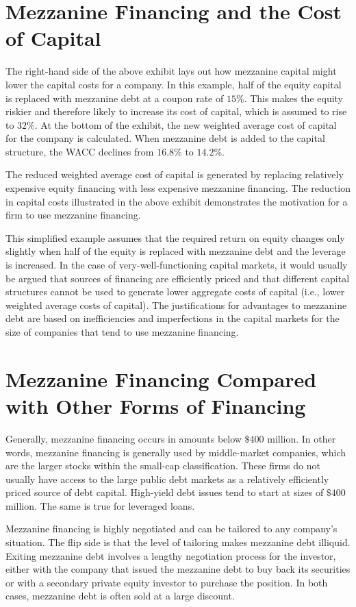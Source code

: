 \documentclass[11pt]{article}
\begin{document}
\section*{Mezzanine Financing and the Cost of Capital}
The right-hand side of the above exhibit lays out how mezzanine capital might lower the capital costs for a company. In this example, half of the equity capital is replaced with mezzanine debt at a coupon rate of $15 \%$. This makes the equity riskier and therefore likely to increase its cost of capital, which is assumed to rise to $32 \%$. At the bottom of the exhibit, the new weighted average cost of capital for the company is calculated. When mezzanine debt is added to the capital structure, the WACC declines from $16.8 \%$ to $14.2 \%$.

The reduced weighted average cost of capital is generated by replacing relatively expensive equity financing with less expensive mezzanine financing. The reduction in capital costs illustrated in the above exhibit demonstrates the motivation for a firm to use mezzanine financing.

This simplified example assumes that the required return on equity changes only slightly when half of the equity is replaced with mezzanine debt and the leverage is increased. In the case of very-well-functioning capital markets, it would usually be argued that sources of financing are efficiently priced and that different capital structures cannot be used to generate lower aggregate costs of capital (i.e., lower weighted average costs of capital). The justifications for advantages to mezzanine debt are based on inefficiencies and imperfections in the capital markets for the size of companies that tend to use mezzanine financing.

\section*{Mezzanine Financing Compared with Other Forms of Financing}
Generally, mezzanine financing occurs in amounts below $\$ 400$ million. In other words, mezzanine financing is generally used by middle-market companies, which are the larger stocks within the small-cap classification. These firms do not usually have access to the large public debt markets as a relatively efficiently priced source of debt capital. High-yield debt issues tend to start at sizes of $\$ 400$ million. The same is true for leveraged loans.

Mezzanine financing is highly negotiated and can be tailored to any company's situation. The flip side is that the level of tailoring makes mezzanine debt illiquid. Exiting mezzanine debt involves a lengthy negotiation process for the investor, either with the company that issued the mezzanine debt to buy back its securities or with a secondary private equity investor to purchase the position. In both cases, mezzanine debt is often sold at a large discount.
\end{document}
